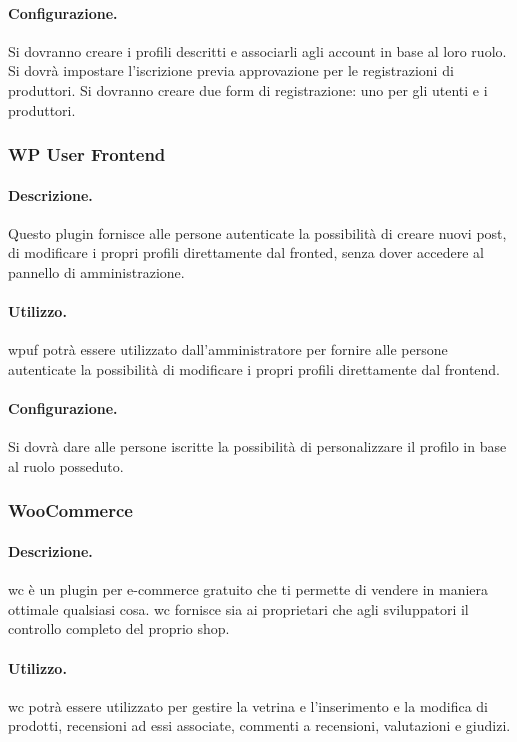 \paragraph{Configurazione.}  Si dovranno creare i profili descritti e associarli agli account in base al loro ruolo. Si dovrà impostare l'iscrizione previa approvazione per le registrazioni di produttori. Si dovranno creare due form di registrazione: uno per gli utenti e i produttori.

\subsubsection{WP User Frontend}
\paragraph{Descrizione.} Questo plugin fornisce alle persone autenticate la possibilità di creare nuovi post, di modificare i propri profili direttamente dal fronted, senza dover accedere al pannello di amministrazione.
\paragraph{Utilizzo.}  \gls{wpuf} potrà essere utilizzato dall'amministratore per fornire alle persone autenticate la possibilità di modificare i propri profili direttamente dal frontend.
\paragraph{Configurazione.} Si dovrà dare alle persone iscritte la possibilità di personalizzare il profilo in base al ruolo posseduto.

\subsubsection{WooCommerce}
\paragraph{Descrizione.} \gls{wc} è un plugin per e-commerce gratuito che ti permette di vendere in maniera ottimale qualsiasi cosa. \gls{wc} fornisce sia ai proprietari che agli sviluppatori il controllo completo del proprio shop.
\paragraph{Utilizzo.} \gls{wc} potrà essere utilizzato per gestire la vetrina e l'inserimento e la modifica di prodotti, recensioni ad essi associate, commenti a recensioni, valutazioni e giudizi.
